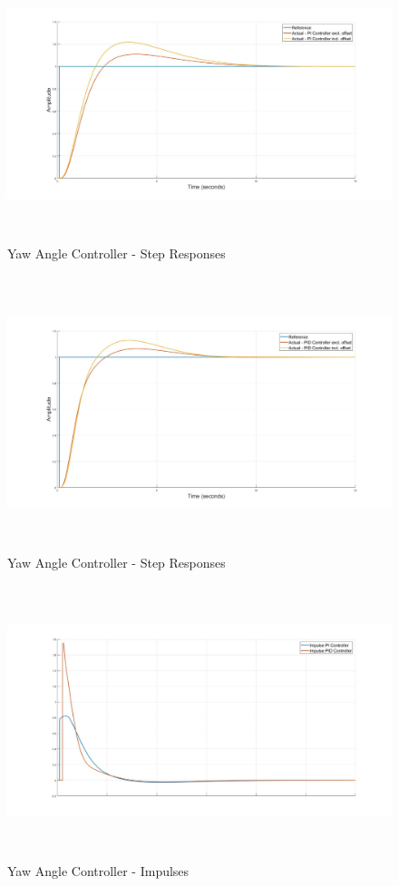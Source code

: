 		\begin{figure}[H]
			\centering
			\includegraphics[height = 8cm]{../Design/Matlab/Controllers/yaw_angle_step.jpg}
			\caption{Yaw Angle Controller -  Step Responses}
			\label{IM_YawAngleStep}
		\end{figure}
		
		\begin{figure}[H]
			\centering
			\includegraphics[height = 8cm]{../Design/Matlab/Controllers/yaw_angle_step_pid.jpg}
			\caption{Yaw Angle Controller -  Step Responses}
			\label{IM_YawAngleStepPID}
		\end{figure}
		
		\begin{figure}[H]
			\centering
			\includegraphics[height = 8cm]{../Design/Matlab/Controllers/yaw_angle_impulse.jpg}
			\caption{Yaw Angle Controller -  Impulses}
			\label{IM_YawAngleImpulse}
		\end{figure}
		
